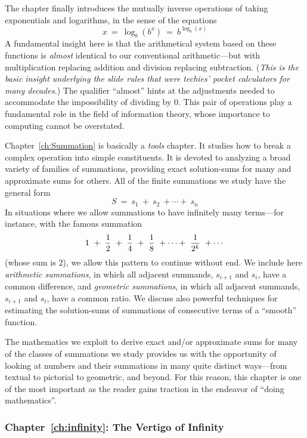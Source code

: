 The chapter finally introduces the mutually inverse operations of
taking exponentials and logarithms, in the sense of the equations
\[  x \ = \ \log_b(b^x) \ = \ b^{\log_b(x)} \]
A fundamental insight here is that the arithmetical system based on
these functions is {\em almost} identical to our conventional
arithmetic---but with multiplication replacing addition and division
replacing subtraction.  ({\em This is the basic insight underlying the
  {\em slide rules} that were techies' pocket calculators for many
  decades.})  The qualifier ``almost'' hints at the adjustments needed
to accommodate the impossibility of dividing by $0$.  This pair of
operations play a fundamental role in the field of information theory,
whose importance to computing cannot be overstated.

\bigskip

Chapter~\ref{ch:Summation} is basically a {\em tools} chapter. 
It studies how to break a complex operation into simple constituents.
It is devoted to analyzing a broad variety of families of summations,
providing exact solution-sums for many and approximate sums for
others.  All of the finite summations we study have the general form
\[ S \ = \ s_1 \ + \ s_2 \ + \cdots + \ s_n \]
In situations where we allow summations to have infinitely many
terms---for instance, with the famous summation
\[ 1 \ + \ {1 \over 2} \ + \ {1 \over 4} \ + \ {1 \over 8} \ + \cdots
+ \ {1 \over {2^k}} \ + \cdots
\]
(whose sum is $2$), we allow this pattern to continue without end.  We
include here {\it arithmetic summations}, in which all adjacent
summands, $s_{i+1}$ and $s_i$, have a common difference, and {\it
  geometric summations}, in which all adjacent summands, $s_{i+1}$ and
$s_i$, have a common ratio.  We discuss also powerful techniques for
estimating the solution-sums of summations of consecutive terms of a
``smooth'' function.

The mathematics we exploit to derive exact and/or approximate sums for
many of the classes of summations we study provides us with the
opportunity of looking at numbers and their summations in many quite
distinct ways---from textual to pictorial to geometric, and beyond.
For this reason, this chapter is one of the most important as the
reader gains traction in the endeavor of ``doing mathematics''.

\subsubsection{Chapter~\ref{ch:infinity}: The Vertigo of Infinity}


